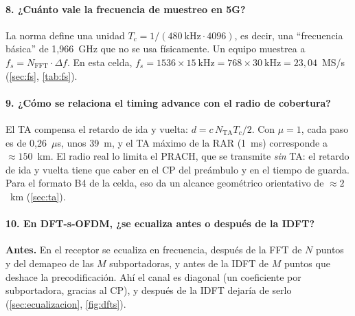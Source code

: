\paragraph{8. ¿Cuánto vale la frecuencia de muestreo en 5G?}
La norma define una unidad $T_c = 1/(480~\text{kHz}\cdot 4096)$, es decir, una ``frecuencia básica'' de 1,966~GHz que no se usa físicamente. Un equipo muestrea a $f_s = N_\text{FFT}\cdot\Delta f$. En esta celda, $f_s = 1536\times 15~\text{kHz} = 768\times 30~\text{kHz} = 23{,}04$~MS/s (\cref{sec:fs}, \cref{tab:fs}).

\paragraph{9. ¿Cómo se relaciona el timing advance con el radio de cobertura?}
El TA compensa el retardo de ida y vuelta: $d = c\,N_\text{TA}T_c/2$. Con $\mu=1$, cada paso es de 0,26~$\mu$s, unos 39~m, y el TA máximo de la RAR (1~ms) corresponde a $\approx 150$~km. El radio real lo limita el PRACH, que se transmite \emph{sin} TA: el retardo de ida y vuelta tiene que caber en el CP del preámbulo y en el tiempo de guarda. Para el formato B4 de la celda, eso da un alcance geométrico orientativo de $\approx 2$~km (\cref{sec:ta}).

\paragraph{10. En DFT-s-OFDM, ¿se ecualiza antes o después de la IDFT?}
\textbf{Antes.} En el receptor se ecualiza en frecuencia, después de la FFT de $N$ puntos y del demapeo de las $M$ subportadoras, y antes de la IDFT de $M$ puntos que deshace la precodificación. Ahí el canal es diagonal (un coeficiente por subportadora, gracias al CP), y después de la IDFT dejaría de serlo (\cref{sec:ecualizacion}, \cref{fig:dfts}).

